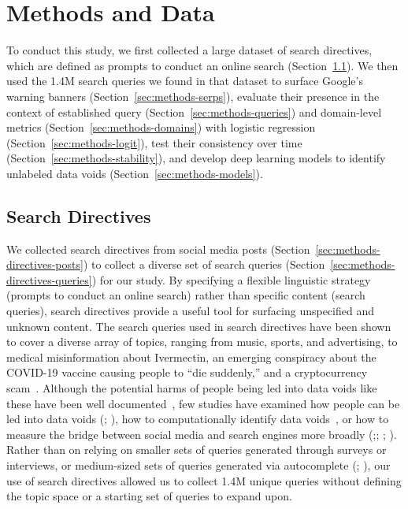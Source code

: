 
\section{Methods and Data}
\label{sec:methods}

To conduct this study, we first collected a large dataset of search directives, which are defined as prompts to conduct an online search (Section~\ref{sec:methods-directives}). 
We then used the 1.4M search queries we found in that dataset to surface Google's warning banners (Section~\ref{sec:methods-serps}), evaluate their presence in the context of established query (Section~\ref{sec:methods-queries}) and domain-level metrics (Section~\ref{sec:methods-domains}) with logistic regression (Section~\ref{sec:methods-logit}), test their consistency over time (Section~\ref{sec:methods-stability}), and develop deep learning models to identify unlabeled data voids (Section~\ref{sec:methods-models}).

\subsection{Search Directives}
\label{sec:methods-directives}

We collected search directives from social media posts (Section~\ref{sec:methods-directives-posts}) to collect a diverse set of search queries (Section~\ref{sec:methods-directives-queries}) for our study.
By specifying a flexible linguistic strategy (prompts to conduct an online search) rather than specific content (search queries), search directives provide a useful tool for surfacing unspecified and unknown content.
The search queries used in search directives have been shown to cover a diverse array of topics, ranging from music, sports, and advertising, to medical misinformation about Ivermectin, an emerging conspiracy about the COVID-19 vaccine causing people to ``die suddenly,'' and a cryptocurrency scam~\citep{robertson2023identifying}. 
Although the potential harms of people being led into data voids like these have been well documented~\citep{golebiewski2019data}, few studies have examined how people can be led into data voids (\cite{tripodi2019devin}; \cite{tripodi2023your}), how to computationally identify data voids~\citep{flores-saviaga2022datavoidant}, or how to measure the bridge between social media and search engines more broadly (\cite{bode2018studying};\cite{lukito2020coordinating}; \cite{yarchi2021political}; \cite{zuckerman2021why}).
Rather than on relying on smaller sets of queries generated through surveys or  interviews, or medium-sized sets of queries generated via autocomplete (\cite{robertson2019auditing}; \cite{haak2023qbias}), our use of search directives allowed us to collect 1.4M unique queries without defining the topic space or a starting set of queries to expand upon.

